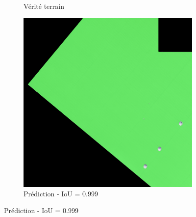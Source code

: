 \begin{figure}[H]
\begin{subfigure}{0.32\textwidth}
    \caption{Vérité terrain}
\end{subfigure}
\hfill
\begin{subfigure}{0.32\textwidth}
    \includegraphics[width=\textwidth]{02-main//figures/ch4/kfold_ensembles/upernet_tu-efficientnetv2_rw_s.ra2_in1k/best_cases/best_5_iou0.999_24991116_tile_5_3_322356_overlay_pred.png}
    \caption{Prédiction - IoU = 0.999}
\end{subfigure}

\vspace{0.35cm}


\end{figure}
